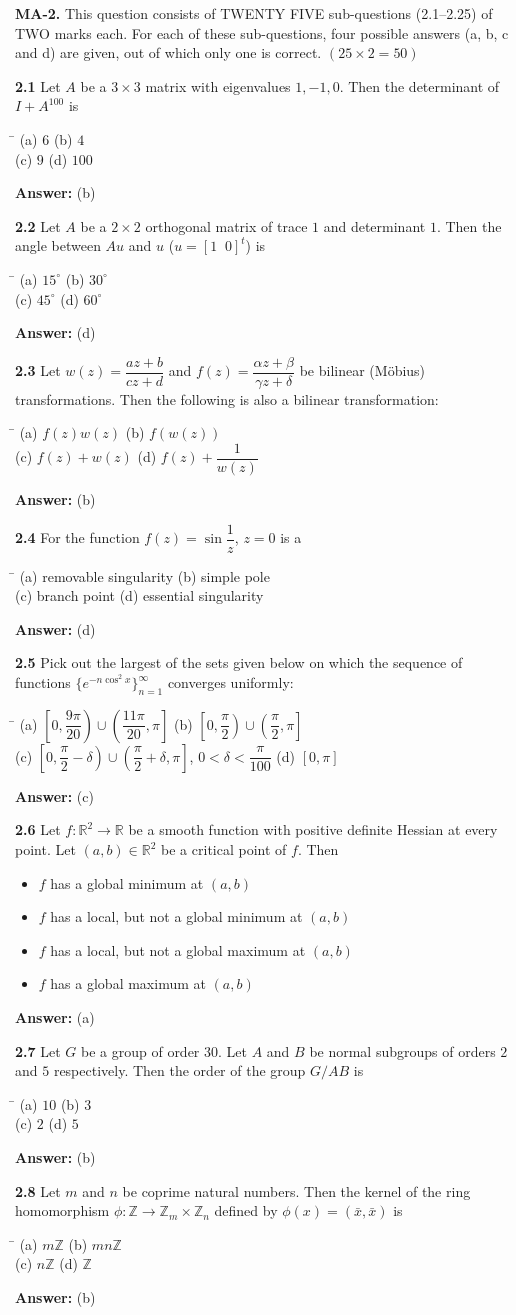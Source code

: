 \documentclass[11pt,a4paper]{article}
\newcommand{\optsfour}[4]{%
  \begin{tabbing}
    \hspace{0.48\linewidth}\=\kill
    (a) #1 \> (b) #2 \\[2pt]
    (c) #3 \> (d) #4
  \end{tabbing}%
}
\newcommand{\optslist}[4]{%
  \begin{itemize}
    \setlength{\itemsep}{2pt}\setlength{\parskip}{0pt}
    \item[(a)] #1
    \item[(b)] #2
    \item[(c)] #3
    \item[(d)] #4
  \end{itemize}%
}
\newcommand{\ans}[1]{\textbf{Answer:} #1\par\medskip}
\begin{document}
\bigskip

\textbf{MA-2.} This question consists of TWENTY FIVE sub-questions (2.1--2.25) of TWO marks each. For each of these sub-questions, four possible answers (a, b, c and d) are given, out of which only one is correct. \hfill $(25 \times 2 = 50)$

\medskip

\textbf{2.1} Let $A$ be a $3 \times 3$ matrix with eigenvalues $1, -1, 0$. Then the determinant of $I + A^{100}$ is
\optsfour{$6$}{$4$}{$9$}{$100$}
\ans{(b)}

\textbf{2.2} Let $A$ be a $2 \times 2$ orthogonal matrix of trace $1$ and determinant $1$. Then the angle between $Au$ and $u$ ($u = [1\;\;0]^t$) is
\optsfour{$15^\circ$}{$30^\circ$}{$45^\circ$}{$60^\circ$}
\ans{(d)}

\textbf{2.3} Let $w(z) = \dfrac{az + b}{cz + d}$ and $f(z) = \dfrac{\alpha z + \beta}{\gamma z + \delta}$ be bilinear (M\"obius) transformations. Then the following is also a bilinear transformation:
\optsfour{$f(z)w(z)$}{$f(w(z))$}{$f(z) + w(z)$}{$f(z) + \dfrac{1}{w(z)}$}
\ans{(b)}

\textbf{2.4} For the function $f(z) = \sin\dfrac{1}{z}$, $z = 0$ is a
\optsfour{removable singularity}{simple pole}{branch point}{essential singularity}
\ans{(d)}

\textbf{2.5} Pick out the largest of the sets given below on which the sequence of functions $\{e^{-n\cos^2 x}\}_{n=1}^{\infty}$ converges uniformly:
\optsfour{$\left[0, \dfrac{9\pi}{20}\right) \cup \left(\dfrac{11\pi}{20}, \pi\right]$}{$\left[0, \dfrac{\pi}{2}\right) \cup \left(\dfrac{\pi}{2}, \pi\right]$}{$\left[0, \dfrac{\pi}{2} - \delta\right) \cup \left(\dfrac{\pi}{2} + \delta, \pi\right]$, $0 < \delta < \dfrac{\pi}{100}$}{$[0, \pi]$}
\ans{(c)}

\textbf{2.6} Let $f : \mathbb{R}^2 \to \mathbb{R}$ be a smooth function with positive definite Hessian at every point. Let $(a, b) \in \mathbb{R}^2$ be a critical point of $f$. Then
\optslist{$f$ has a global minimum at $(a, b)$}{$f$ has a local, but not a global minimum at $(a, b)$}{$f$ has a local, but not a global maximum at $(a, b)$}{$f$ has a global maximum at $(a, b)$}
\ans{(a)}

\textbf{2.7} Let $G$ be a group of order $30$. Let $A$ and $B$ be normal subgroups of orders $2$ and $5$ respectively. Then the order of the group $G / AB$ is
\optsfour{$10$}{$3$}{$2$}{$5$}
\ans{(b)}

\textbf{2.8} Let $m$ and $n$ be coprime natural numbers. Then the kernel of the ring homomorphism $\phi : \mathbb{Z} \to \mathbb{Z}_m \times \mathbb{Z}_n$ defined by $\phi(x) = (\bar{x}, \bar{x})$ is
\optsfour{$m\mathbb{Z}$}{$mn\mathbb{Z}$}{$n\mathbb{Z}$}{$\mathbb{Z}$}
\ans{(b)}
\end{document}

